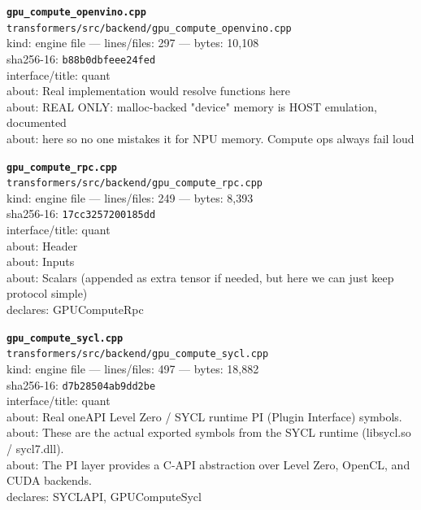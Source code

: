 \noindent\textbf{\texttt{gpu\_compute\_openvino.cpp}}\\
\texttt{transformers/src/backend/gpu\_compute\_openvino.cpp}\\
kind: engine file --- lines/files: 297 --- bytes: 10,108\\
sha256-16: \texttt{b88b0dbfeee24fed}\\
interface/title: quant\\
about: Real implementation would resolve functions here\\
about: REAL ONLY: malloc-backed "device" memory is HOST emulation, documented\\
about: here so no one mistakes it for NPU memory. Compute ops always fail loud\\
\vspace*{6.0pt}

\noindent\textbf{\texttt{gpu\_compute\_rpc.cpp}}\\
\texttt{transformers/src/backend/gpu\_compute\_rpc.cpp}\\
kind: engine file --- lines/files: 249 --- bytes: 8,393\\
sha256-16: \texttt{17cc3257200185dd}\\
interface/title: quant\\
about: Header\\
about: Inputs\\
about: Scalars (appended as extra tensor if needed, but here we can just keep protocol simple)\\
declares: GPUComputeRpc\\
\vspace*{6.0pt}
\newpage

\noindent\textbf{\texttt{gpu\_compute\_sycl.cpp}}\\
\texttt{transformers/src/backend/gpu\_compute\_sycl.cpp}\\
kind: engine file --- lines/files: 497 --- bytes: 18,882\\
sha256-16: \texttt{d7b28504ab9dd2be}\\
interface/title: quant\\
about: Real oneAPI Level Zero / SYCL runtime PI (Plugin Interface) symbols.\\
about: These are the actual exported symbols from the SYCL runtime (libsycl.so / sycl7.dll).\\
about: The PI layer provides a C-API abstraction over Level Zero, OpenCL, and CUDA backends.\\
declares: SYCLAPI, GPUComputeSycl\\
\vspace*{6.0pt}

